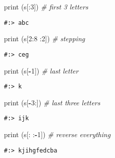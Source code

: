 \documentclass[
]{book}
\newenvironment{Shaded}{\begin{snugshade}}{\end{snugshade}}
\newcommand{\BuiltInTok}[1]{#1}
\newcommand{\CommentTok}[1]{\textcolor[rgb]{0.37,0.37,0.37}{\textit{#1}}}
\newcommand{\DecValTok}[1]{\textcolor[rgb]{0.06,0.06,0.06}{#1}}
\newcommand{\NormalTok}[1]{#1}
\newcommand{\OperatorTok}[1]{\textcolor[rgb]{0.43,0.43,0.43}{\textbf{#1}}}
\begin{document}
\begin{Shaded}
\begin{Highlighting}[]
\BuiltInTok{print}\NormalTok{ (s[:}\DecValTok{3}\NormalTok{])      }\CommentTok{\# first 3 letters}
\end{Highlighting}
\end{Shaded}

\begin{verbatim}
#:> abc
\end{verbatim}

\begin{Shaded}
\begin{Highlighting}[]
\BuiltInTok{print}\NormalTok{ (s[}\DecValTok{2}\NormalTok{:}\DecValTok{8}\NormalTok{ :}\DecValTok{2}\NormalTok{])  }\CommentTok{\# stepping}
\end{Highlighting}
\end{Shaded}

\begin{verbatim}
#:> ceg
\end{verbatim}

\begin{Shaded}
\begin{Highlighting}[]
\BuiltInTok{print}\NormalTok{ (s[}\OperatorTok{{-}}\DecValTok{1}\NormalTok{])      }\CommentTok{\# last letter}
\end{Highlighting}
\end{Shaded}

\begin{verbatim}
#:> k
\end{verbatim}

\begin{Shaded}
\begin{Highlighting}[]
\BuiltInTok{print}\NormalTok{ (s[}\OperatorTok{{-}}\DecValTok{3}\NormalTok{:])     }\CommentTok{\# last three letters}
\end{Highlighting}
\end{Shaded}

\begin{verbatim}
#:> ijk
\end{verbatim}

\begin{Shaded}
\begin{Highlighting}[]
\BuiltInTok{print}\NormalTok{ (s[:   :}\OperatorTok{{-}}\DecValTok{1}\NormalTok{]) }\CommentTok{\# reverse everything}
\end{Highlighting}
\end{Shaded}

\begin{verbatim}
#:> kjihgfedcba
\end{verbatim}
\end{document}
